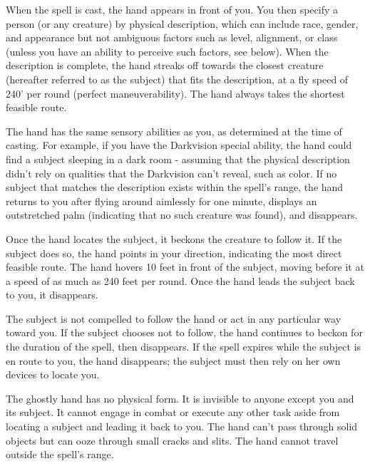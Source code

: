 When the spell is cast, the hand appears in front of you. 
You then specify a person (or any creature) by physical description, which can include race, gender, and appearance but not ambiguous factors such as level, alignment, or class (unless you have an ability to perceive such factors, see below).
When the description is complete, the hand streaks off towards the closest creature (hereafter referred to as the subject) that fits the description, at a fly speed of 240' per round (perfect maneuverability). The hand always takes the shortest feasible route.

The hand has the same sensory abilities as you, as determined at the time of casting. For example, if you have the Darkvision special ability, the hand could find a subject sleeping in a dark room - assuming that the physical description didn't rely on qualities that the Darkvision can't reveal, such as color. If no subject that matches the description exists within the spell's range, the hand returns to you after flying around aimlessly for one minute, displays an outstretched palm (indicating that no such creature was found), and disappears.

Once the hand locates the subject, it beckons the creature to follow it. 
If the subject does so, the hand points in your direction, indicating the most direct feasible route. 
The hand hovers 10 feet in front of the subject, moving before it at a speed of as much as 240 feet per round. 
Once the hand leads the subject back to you, it disappears.

The subject is not compelled to follow the hand or act in any particular way toward you. 
If the subject chooses not to follow, the hand continues to beckon for the duration of the spell, then disappears. 
If the spell expires while the subject is en route to you, the hand disappears; the subject must then rely on her own devices to locate you.

The ghostly hand has no physical form. 
It is invisible to anyone except you and its subject. 
It cannot engage in combat or execute any other task aside from locating a subject and leading it back to you. 
The hand can't pass through solid objects but can ooze through small cracks and slits. 
The hand cannot travel outside the spell's range.

